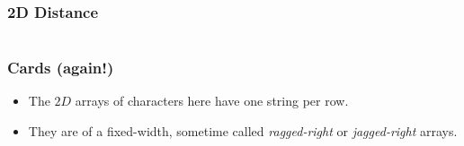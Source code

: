
\begin{frame}[fragile]
\frametitle{2D Distance}

\begin{columns}
\begin{column}{0.45\textwidth}

\end{column}

\begin{column}{0.45\textwidth}
\end{column}

\end{columns}
\end{frame}



\begin{frame}[fragile]
\frametitle{Cards (again!)}



\begin{itemize}[<+->]
\item The $2D$ arrays of characters here have one string per row.
\item They are of a fixed-width, sometime called {\em ragged-right} or {\em jagged-right} arrays.
\end{itemize}

\end{frame}


